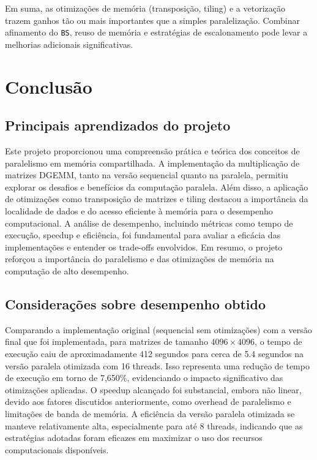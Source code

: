 \documentclass[12pt, a4paper]{article}
\begin{document}
	Em suma, as otimizações de memória (transposição, tiling) e a vetorização trazem ganhos tão ou mais importantes que a simples paralelização. Combinar afinamento do \texttt{BS}, reuso de memória e estratégias de escalonamento pode levar a melhorias adicionais significativas.

	\newpage
	\section{Conclusão}

	\subsection{Principais aprendizados do projeto}
	
	Este projeto proporcionou uma compreensão prática e teórica dos conceitos de paralelismo em memória compartilhada. A implementação da multiplicação de matrizes DGEMM, tanto na versão sequencial quanto na paralela, permitiu explorar os desafios e benefícios da computação paralela. Além disso, a aplicação de otimizações como transposição de matrizes e tiling destacou a importância da localidade de dados e do acesso eficiente à memória para o desempenho computacional. A análise de desempenho, incluindo métricas como tempo de execução, speedup e eficiência, foi fundamental para avaliar a eficácia das implementações e entender os trade-offs envolvidos. Em resumo, o projeto reforçou a importância do paralelismo e das otimizações de memória na computação de alto desempenho.

	\subsection{Considerações sobre desempenho obtido}
	
	Comparando a implementação original (sequencial sem otimizações) com a versão final que foi implementada, para matrizes de tamanho $4096 \times 4096$, o tempo de execução caiu de aproximadamente 412 segundos para cerca de 5.4 segundos na versão paralela otimizada com 16 threads. Isso representa uma redução de tempo de execução em torno de 7,650\%, evidenciando o impacto significativo das otimizações aplicadas. O speedup alcançado foi substancial, embora não linear, devido aos fatores discutidos anteriormente, como overhead de paralelismo e limitações de banda de memória. A eficiência da versão paralela otimizada se manteve relativamente alta, especialmente para até 8 threads, indicando que as estratégias adotadas foram eficazes em maximizar o uso dos recursos computacionais disponíveis.
\end{document}
